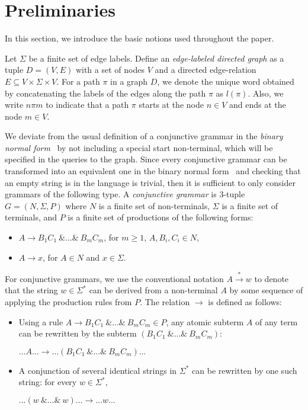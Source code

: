 \section{Preliminaries} \label{section_preliminaries}
In this section, we introduce the basic notions used throughout the paper.

Let $\Sigma$ be a finite set of edge labels. Define an \textit{edge-labeled directed graph} as a tuple $D = (V, E)$ with a set of nodes $V$ and a directed edge-relation $E \subseteq V \times \Sigma \times V$.  For a path $\pi$ in a graph $D$, we denote the unique word obtained by concatenating the labels of the edges along the path $\pi$ as $l(\pi)$. Also, we write $n \pi m$ to indicate that a path $\pi$ starts at the node $n \in V$ and ends at the node $m \in V$.

We deviate from the usual definition of a conjunctive grammar in the \textit{binary normal form}~\cite{okhotinConjAndBool} by not including a special start non-terminal, which will be specified in the queries to the graph. Since every conjunctive grammar can be transformed into an equivalent one in the binary normal form~\cite{okhotinConjAndBool} and checking that an empty string is in the language is trivial, then it is sufficient to only consider grammars of the following type. A \textit{conjunctive grammar} is 3-tuple $G = (N, \Sigma, P)$ where $N$ is a finite set of non-terminals, $\Sigma$ is a finite set of terminals, and $P$ is a finite set of productions of the following forms:

\begin{itemize}
	\item $A \rightarrow B_1 C_1~\& \ldots \&~B_m C_m$, for $m \geq 1$, $A,B_i,C_i \in N$,
	\item $A \rightarrow x$, for $A \in N$ and $x \in \Sigma$.   
\end{itemize}

For conjunctive grammars, we use the conventional notation $A \xrightarrow{*} w$ to denote that the string $w \in \Sigma^*$ can be derived from a non-terminal $A$ by some sequence of applying the production rules from $P$. The relation $\rightarrow$ is defined as follows:
\begin{itemize}
	\item Using a rule $A \rightarrow B_1 C_1~\& \ldots \&~B_m C_m \in P$, any atomic subterm $A$ of any term can be rewritten by the subterm $(B_1 C_1 ~\& \ldots \&~ B_m C_m)$:
	\begin{center}
		$\ldots A \ldots \rightarrow \ldots (B_1 C_1~\& \ldots \&~B_m C_m) \ldots$
	\end{center}
	\item A conjunction of several identical strings in $\Sigma^*$ can be rewritten by one such string: for every $w \in \Sigma^*$,
	\begin{center}
		$\ldots (w~\& \ldots \&~w) \ldots \rightarrow \ldots w \ldots$
	\end{center}
	
\end{itemize}

